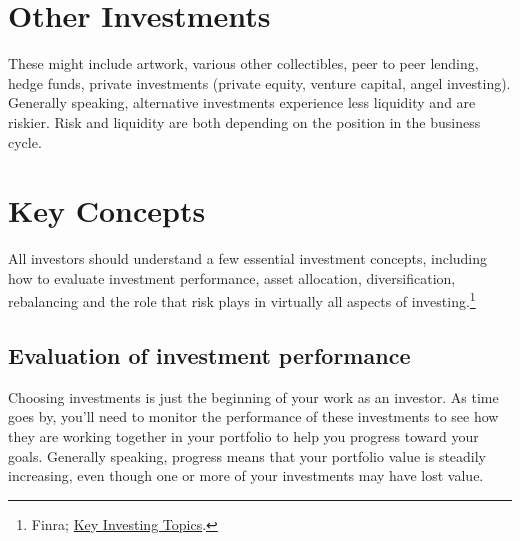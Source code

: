  \medskip
    \begin{tcolorbox}
    [enhanced,
    title=Class 3: Representation - Tokenized Securities,
    frame style=
    {left color=orange!85!black,right color=yellow!95!black}]
       
    \end{tcolorbox}


\section{Other Investments}
These might include artwork, various other collectibles, peer to peer lending, hedge funds, private investments (private equity, venture capital, angel investing). 
Generally speaking, alternative investments experience less liquidity and are riskier. Risk and liquidity are both depending on the position in the business cycle. 



\section{Key Concepts}
All investors should understand a few essential investment concepts, including how to evaluate investment performance, asset allocation, diversification, rebalancing and the role that risk plays in virtually all aspects of investing.\footnote{Finra; \href{https://www.finra.org/investors/key-investing-concepts}{Key Investing Topics}.}


\subsection{Evaluation of investment performance}
Choosing investments is just the beginning of your work as an investor. As time goes by, you'll need to monitor the performance of these investments to see how they are working together in your portfolio to help you progress toward your goals. Generally speaking, progress means that your portfolio value is steadily increasing, even though one or more of your investments may have lost value.

